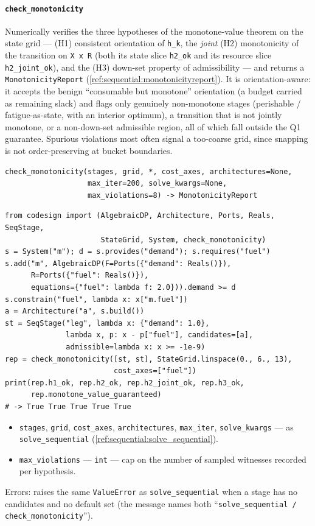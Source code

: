 \documentclass[11pt,a4paper]{article}
\begin{document}
\paragraph{\texttt{check\_monotonicity}}\label{ref:sequential:check_monotonicity}
Numerically verifies the three hypotheses of the monotone-value theorem on
the state grid --- (H1) consistent orientation of \texttt{h\_k}, the
\emph{joint} (H2) monotonicity of the transition on \texttt{X x R} (both its
state slice \texttt{h2\_ok} and its resource slice \texttt{h2\_joint\_ok}),
and the (H3) down-set property of admissibility --- and returns a
\texttt{MonotonicityReport} (\ref{ref:sequential:monotonicityreport}). It is
orientation-aware: it accepts the benign ``consumable but monotone''
orientation (a budget carried as remaining slack) and flags only genuinely
non-monotone stages (perishable / fatigue-as-state, with an interior
optimum), a transition that is not jointly monotone, or a non-down-set
admissible region, all of which fall outside the Q1 guarantee. Spurious
violations most often signal a too-coarse grid, since snapping is not
order-preserving at bucket boundaries.
\begin{lstlisting}
check_monotonicity(stages, grid, *, cost_axes, architectures=None,
                   max_iter=200, solve_kwargs=None,
                   max_violations=8) -> MonotonicityReport
\end{lstlisting}
\begin{lstlisting}
from codesign import (AlgebraicDP, Architecture, Ports, Reals, SeqStage,
                      StateGrid, System, check_monotonicity)
s = System("m"); d = s.provides("demand"); s.requires("fuel")
s.add("m", AlgebraicDP(F=Ports({"demand": Reals()}),
      R=Ports({"fuel": Reals()}),
      equations={"fuel": lambda f: 2.0})).demand >= d
s.constrain("fuel", lambda x: x["m.fuel"])
a = Architecture("a", s.build())
st = SeqStage("leg", lambda x: {"demand": 1.0},
              lambda x, p: x - p["fuel"], candidates=[a],
              admissible=lambda x: x >= -1e-9)
rep = check_monotonicity([st, st], StateGrid.linspace(0., 6., 13),
                         cost_axes=["fuel"])
print(rep.h1_ok, rep.h2_ok, rep.h2_joint_ok, rep.h3_ok,
      rep.monotone_value_guaranteed)
# -> True True True True True
\end{lstlisting}
\begin{itemize}[nosep]
  \item \texttt{stages}, \texttt{grid}, \texttt{cost\_axes},
    \texttt{architectures}, \texttt{max\_iter}, \texttt{solve\_kwargs} ---
    as \texttt{solve\_sequential} (\ref{ref:sequential:solve_sequential}).
  \item \texttt{max\_violations} --- \texttt{int} --- cap on the number of
    sampled witnesses recorded per hypothesis.
\end{itemize}
Errors: raises the same \texttt{ValueError} as
\texttt{solve\_sequential} when a stage has no candidates and no default set
(the message names both ``\texttt{solve\_sequential / check\_monotonicity}'').
\end{document}
